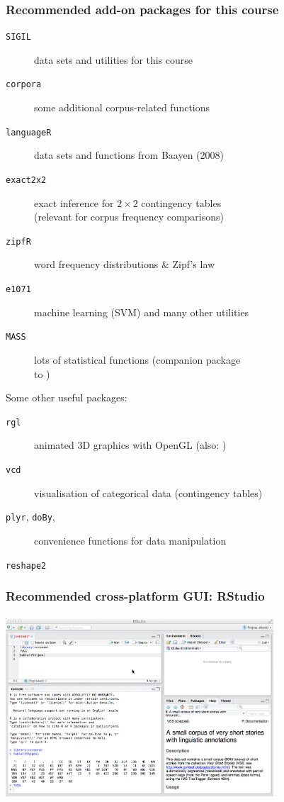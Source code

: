 \documentclass[t]{beamer} %
\begin{document}
\begin{frame}
  \frametitle{Recommended add-on packages for this course}

  \begin{description}
  \item[\texttt{SIGIL}] data sets and utilities for this course
  \item[\texttt{corpora}] some additional corpus-related functions
  \item[\texttt{languageR}] data sets and functions from Baayen (2008)
  \item[\texttt{exact2x2}] exact inference for $2\times 2$ contingency
    tables\\ (relevant for corpus frequency comparisons)
  \item[\texttt{zipfR}] word frequency distributions \& Zipf's law
  \item[\texttt{e1071}] machine learning (SVM) and many other utilities
  \item[\texttt{MASS}] lots of statistical functions (companion package\\
    to )
  \end{description}

  \gap[.5]
  Some other useful packages:
  \begin{description}
  \item[\texttt{rgl}] animated 3D graphics with OpenGL (also: )
  \item[\texttt{vcd}] visualisation of categorical data (contingency tables)
  \item[\texttt{plyr}, \texttt{doBy},] convenience functions for data manipulation
  \item[\texttt{reshape2}]
  \end{description}
\end{frame}

\begin{frame}[fragile]
  \frametitle{Recommended cross-platform GUI: RStudio}
  \framesubtitle{}

  \centering
  \includegraphics[width=10cm]{img/rstudio}

\end{frame}
\end{document}
